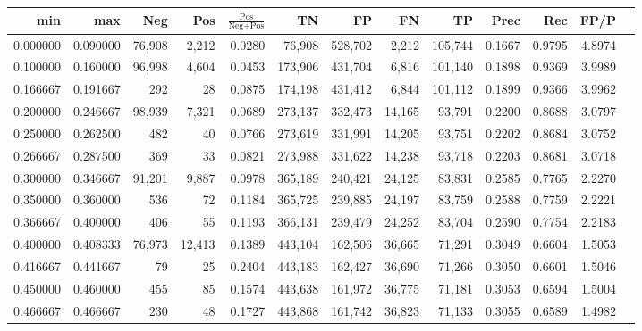 \begin{tabular}{rrrrrrrrrrrrr}
\toprule
     min &      max &    Neg &    Pos & $\frac{\text{Pos}}{\text{Neg}+\text{Pos}}$ &      TN &      FP &      FN &      TP &   Prec &    Rec &   FP/P \\
\midrule
0.000000 & 0.090000 & 76,908 &  2,212 &                                     0.0280 &  76,908 & 528,702 &   2,212 & 105,744 & 0.1667 & 0.9795 & 4.8974 \\
0.100000 & 0.160000 & 96,998 &  4,604 &                                     0.0453 & 173,906 & 431,704 &   6,816 & 101,140 & 0.1898 & 0.9369 & 3.9989 \\
0.166667 & 0.191667 &    292 &     28 &                                     0.0875 & 174,198 & 431,412 &   6,844 & 101,112 & 0.1899 & 0.9366 & 3.9962 \\
0.200000 & 0.246667 & 98,939 &  7,321 &                                     0.0689 & 273,137 & 332,473 &  14,165 &  93,791 & 0.2200 & 0.8688 & 3.0797 \\
0.250000 & 0.262500 &    482 &     40 &                                     0.0766 & 273,619 & 331,991 &  14,205 &  93,751 & 0.2202 & 0.8684 & 3.0752 \\
0.266667 & 0.287500 &    369 &     33 &                                     0.0821 & 273,988 & 331,622 &  14,238 &  93,718 & 0.2203 & 0.8681 & 3.0718 \\
0.300000 & 0.346667 & 91,201 &  9,887 &                                     0.0978 & 365,189 & 240,421 &  24,125 &  83,831 & 0.2585 & 0.7765 & 2.2270 \\
0.350000 & 0.360000 &    536 &     72 &                                     0.1184 & 365,725 & 239,885 &  24,197 &  83,759 & 0.2588 & 0.7759 & 2.2221 \\
0.366667 & 0.400000 &    406 &     55 &                                     0.1193 & 366,131 & 239,479 &  24,252 &  83,704 & 0.2590 & 0.7754 & 2.2183 \\
0.400000 & 0.408333 & 76,973 & 12,413 &                                     0.1389 & 443,104 & 162,506 &  36,665 &  71,291 & 0.3049 & 0.6604 & 1.5053 \\
0.416667 & 0.441667 &     79 &     25 &                                     0.2404 & 443,183 & 162,427 &  36,690 &  71,266 & 0.3050 & 0.6601 & 1.5046 \\
0.450000 & 0.460000 &    455 &     85 &                                     0.1574 & 443,638 & 161,972 &  36,775 &  71,181 & 0.3053 & 0.6594 & 1.5004 \\
0.466667 & 0.466667 &    230 &     48 &                                     0.1727 & 443,868 & 161,742 &  36,823 &  71,133 & 0.3055 & 0.6589 & 1.4982 \\

\end{tabular}
